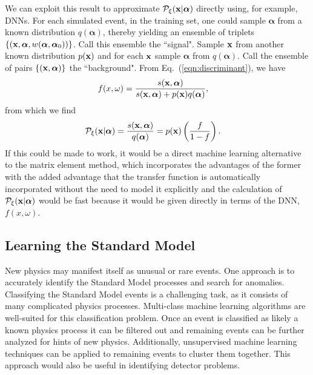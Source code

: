 We can exploit this result to approximate $\mathcal{P}_{\xi}({\bf x}|{\boldsymbol\alpha})$ directly using, for example, DNNs. For each simulated event, in the training set, one could sample $\boldsymbol{\alpha}$ from a known distribution $q(\boldsymbol{\alpha})$, thereby yielding an ensemble of triplets $\{ ({\bf x}, \boldsymbol{\alpha}, w(\boldsymbol{\alpha}, \boldsymbol{\alpha}_0)) \}$. Call this ensemble the ``signal". Sample ${\bf x}$ from another known distribution $p({\bf x})$ and for each ${\bf x}$ sample $\boldsymbol{\alpha}$ from $q(\boldsymbol{\alpha})$. Call the ensemble of pairs $\{({\bf x}, \boldsymbol{\alpha})\}$ the ``background". From Eq.~(\ref{eqn:discriminant}), we have
\begin{align}
 f(x, \omega) & = \frac{s({\bf x}, \boldsymbol{\alpha})}{s({\bf x}, \boldsymbol{\alpha}) + p({\bf x}) q(\boldsymbol{\alpha})},
\end{align}
from which we find
\begin{align}
 \mathcal{P}_{\xi}({\bf x}|{\boldsymbol\alpha}) & = \frac{s({\bf x}, {\boldsymbol\alpha})}{q(\boldsymbol{\alpha})} = p({\bf x}) \left( \frac{f}{1 - f} \right).
\end{align}
If this could be made to work, it would be a direct machine learning alternative to the matrix element method, which incorporates the advantages of the former with the added advantage that the transfer function is automatically incorporated without the need to model it explicitly and the calculation of $\mathcal{P}_{\xi}({\bf x}|{\boldsymbol\alpha})$ would be fast because it would be given directly in terms of the DNN, $f(x, \omega)$.

\subsection{Learning the Standard Model}

New physics may manifest itself as unusual or rare events. One approach is to accurately identify the Standard Model processes and search for anomalies. Classifying the Standard Model events is a challenging task, as it consists of many complicated physics processes. Multi-class machine learning algorithms are well-suited for this classification problem. Once an event is classified as likely a known physics process it can be filtered out and remaining events can be further analyzed for hints of new physics. Additionally, unsupervised machine learning techniques can be applied to remaining events to cluster them together. This approach would also be useful in identifying detector problems.




